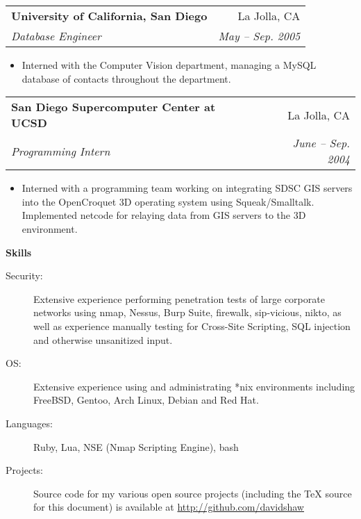 \documentclass[letterpaper,11pt]{article}
\makeatletter
\newcommand{\resitem}[1]{\item #1 \vspace{-2pt}}
\newcommand{\resheading}[1]{{\large \colorbox{mygrey}{\begin{minipage}{\textwidth}{\textbf{#1 \vphantom{p\^{E}}}}\end{minipage}}}}
\newcommand{\ressubheading}[4]{
\begin{tabular*}{6.5in}{l@{\extracolsep{\fill}}r}
		\textbf{#1} & #2 \\
		\textit{#3} & \textit{#4} \\
\end{tabular*}\vspace{-6pt}}
\makeatother
\begin{document}
\begin{description}
{\begin{itemize}
				\end{itemize}
				}
	\item\ressubheading{{University of California, San Diego}}{La Jolla, CA}{Database Engineer}{May -- Sep. 2005}
				{ \footnotesize
				\begin{itemize}
					\resitem{Interned with the Computer Vision department, managing a MySQL database of contacts throughout the department.}
				\end{itemize}
				}
	\item\ressubheading{{San Diego Supercomputer Center at UCSD}}{La Jolla, CA}{Programming Intern}{June -- Sep. 2004}
				{ \footnotesize
				\begin{itemize}
					\resitem{Interned with a programming team working on integrating SDSC GIS servers into the OpenCroquet 3D operating system using Squeak/Smalltalk. Implemented netcode for relaying data from GIS servers to the 3D environment.}
				\end{itemize}
				}
	\end{description}  %

\resheading{{Skills}}
	\begin{description}
		\item[Security:] { \footnotesize Extensive experience performing penetration tests of large corporate networks using nmap, Nessus, Burp Suite, firewalk, sip-vicious, nikto, as well as experience manually testing for Cross-Site Scripting, SQL injection and otherwise unsanitized input.}
		\item[OS:] { \footnotesize Extensive experience using and administrating *nix environments including FreeBSD, Gentoo, Arch Linux, Debian and Red Hat.}
		\item[Languages:] { \footnotesize Ruby, Lua, NSE (Nmap Scripting Engine), bash}
		\item[Projects:] { \footnotesize Source code for my various open source projects (including the TeX source for this document) is available at \href{http://www.github.com/davidshaw}{http://github.com/davidshaw}}
	\end{description} %
\end{document}
